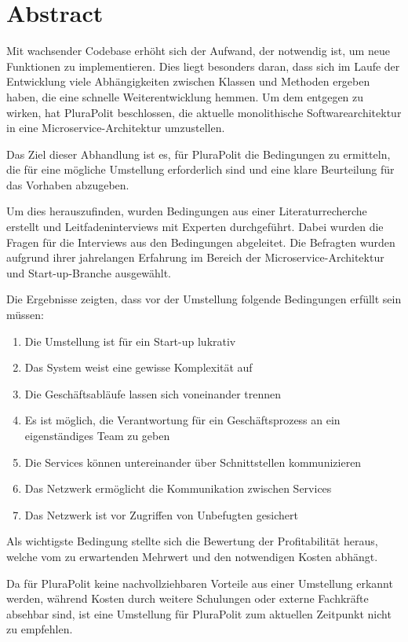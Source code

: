 \section*{Abstract}

Mit wachsender Codebase erhöht sich der Aufwand, der notwendig ist, um neue Funktionen zu implementieren. Dies liegt besonders daran, dass sich im Laufe der Entwicklung viele Abhängigkeiten zwischen Klassen und Methoden ergeben haben, die eine schnelle Weiterentwicklung hemmen. Um dem entgegen zu wirken, hat PluraPolit beschlossen, die aktuelle monolithische Softwarearchitektur in eine Microservice-Architektur umzustellen.

Das Ziel dieser Abhandlung ist es, für PluraPolit die Bedingungen zu ermitteln, die für eine mögliche Umstellung erforderlich sind und eine klare Beurteilung für das Vorhaben abzugeben.

Um dies herauszufinden, wurden Bedingungen aus einer Literaturrecherche erstellt und Leitfadeninterviews mit Experten durchgeführt. Dabei wurden die Fragen für die Interviews aus den Bedingungen abgeleitet. Die Befragten wurden aufgrund ihrer jahrelangen Erfahrung im Bereich der Microservice-Architektur und Start-up-Branche ausgewählt.

Die Ergebnisse zeigten, dass vor der Umstellung folgende Bedingungen erfüllt sein müssen:
\begin{enumerate}
	\item Die Umstellung ist für ein Start-up lukrativ
	\item Das System weist eine gewisse Komplexität auf
	\item Die Geschäftsabläufe lassen sich voneinander trennen
	\item Es ist möglich, die Verantwortung für ein Geschäftsprozess an ein eigenständiges Team zu geben
	\item Die Services können untereinander über Schnittstellen kommunizieren
	\item Das Netzwerk ermöglicht die Kommunikation zwischen Services
	\item Das Netzwerk ist vor Zugriffen von Unbefugten gesichert
\end{enumerate}

Als wichtigste Bedingung stellte sich die Bewertung der Profitabilität heraus, welche vom zu erwartenden Mehrwert und den notwendigen Kosten abhängt.

Da für PluraPolit keine nachvollziehbaren Vorteile aus einer Umstellung erkannt werden, während Kosten durch weitere Schulungen oder externe Fachkräfte absehbar sind, ist eine Umstellung für PluraPolit zum aktuellen Zeitpunkt nicht zu empfehlen.

